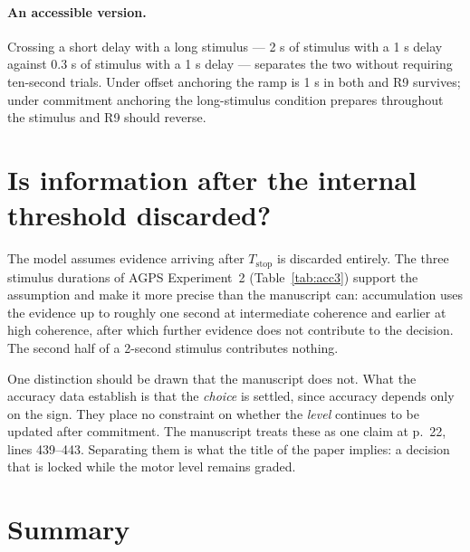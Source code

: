 \documentclass[11pt,a4paper]{article}
\newcommand{\Tstop}{T_{\text{stop}}}
\theoremstyle{plain}
\theoremstyle{remark}
\begin{document}
\paragraph{An accessible version.} Crossing a short delay with a long stimulus --- 2 s of
stimulus with a 1 s delay against 0.3 s of stimulus with a 1 s delay --- separates the two
without requiring ten-second trials. Under offset anchoring the ramp is 1 s in both and R9
survives; under commitment anchoring the long-stimulus condition prepares throughout the
stimulus and R9 should reverse.

\section{Is information after the internal threshold discarded?}

The model assumes evidence arriving after $\Tstop$ is discarded entirely. The three stimulus
durations of AGPS Experiment~2 (Table~\ref{tab:acc3}) support the assumption and make it
more precise than the manuscript can: accumulation uses the evidence up to roughly one
second at intermediate coherence and earlier at high coherence, after which further evidence
does not contribute to the decision. The second half of a 2-second stimulus contributes
nothing.

One distinction should be drawn that the manuscript does not. What the accuracy data
establish is that the \emph{choice} is settled, since accuracy depends only on the sign.
They place no constraint on whether the \emph{level} continues to be updated after
commitment. The manuscript treats these as one claim at p.~22, lines 439--443. Separating
them is what the title of the paper implies: a decision that is locked while the motor level
remains graded.

\section{Summary}
\end{document}

